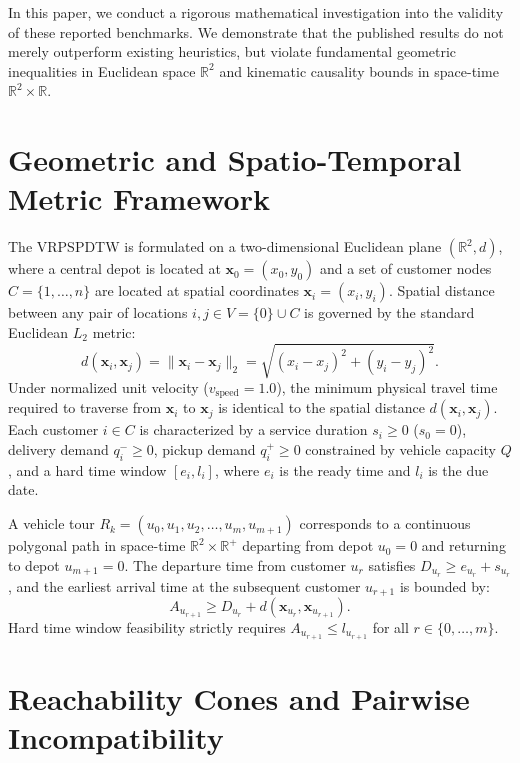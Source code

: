 \documentclass[review]{elsarticle}
\begin{document}
In this paper, we conduct a rigorous mathematical investigation into the validity of these reported benchmarks. We demonstrate that the published results do not merely outperform existing heuristics, but violate fundamental geometric inequalities in Euclidean space $\mathbb{R}^2$ and kinematic causality bounds in space-time $\mathbb{R}^2 \times \mathbb{R}$.

\section{Geometric and Spatio-Temporal Metric Framework}
\label{sec:metric_space}
The VRPSPDTW is formulated on a two-dimensional Euclidean plane $(\mathbb{R}^2, d)$, where a central depot is located at $\mathbf{x}_0 = (x_0, y_0)$ and a set of customer nodes $C = \{1, \dots, n\}$ are located at spatial coordinates $\mathbf{x}_i = (x_i, y_i)$. Spatial distance between any pair of locations $i, j \in V = \{0\} \cup C$ is governed by the standard Euclidean $L_2$ metric:
\begin{equation}
d(\mathbf{x}_i, \mathbf{x}_j) = \|\mathbf{x}_i - \mathbf{x}_j\|_2 = \sqrt{(x_i - x_j)^2 + (y_i - y_j)^2}.
\end{equation}
Under normalized unit velocity ($v_{\text{speed}} = 1.0$), the minimum physical travel time required to traverse from $\mathbf{x}_i$ to $\mathbf{x}_j$ is identical to the spatial distance $d(\mathbf{x}_i, \mathbf{x}_j)$. Each customer $i \in C$ is characterized by a service duration $s_i \ge 0$ ($s_0 = 0$), delivery demand $q_i^- \ge 0$, pickup demand $q_i^+ \ge 0$ constrained by vehicle capacity $Q$, and a hard time window $[e_i, l_i]$, where $e_i$ is the ready time and $l_i$ is the due date.

A vehicle tour $R_k = (u_0, u_1, u_2, \dots, u_m, u_{m+1})$ corresponds to a continuous polygonal path in space-time $\mathbb{R}^2 \times \mathbb{R}^+$ departing from depot $u_0 = 0$ and returning to depot $u_{m+1} = 0$. The departure time from customer $u_r$ satisfies $D_{u_r} \ge e_{u_r} + s_{u_r}$, and the earliest arrival time at the subsequent customer $u_{r+1}$ is bounded by:
\begin{equation}
A_{u_{r+1}} \ge D_{u_r} + d(\mathbf{x}_{u_r}, \mathbf{x}_{u_{r+1}}).
\end{equation}
Hard time window feasibility strictly requires $A_{u_{r+1}} \le l_{u_{r+1}}$ for all $r \in \{0, \dots, m\}$.

\section{Reachability Cones and Pairwise Incompatibility}
\label{sec:reachability}
\end{document}
